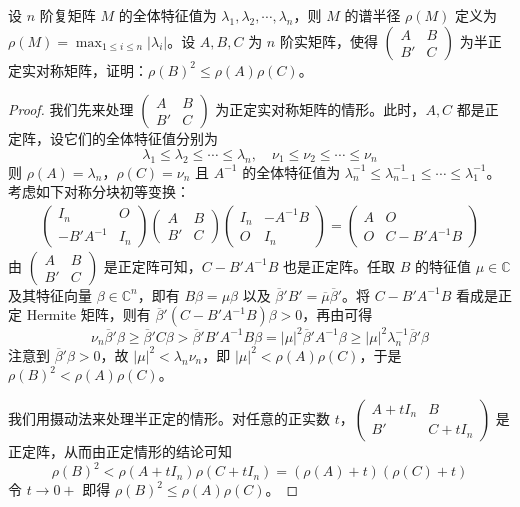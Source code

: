 \documentclass[../../main.tex]{subfiles}
\begin{document}
\begin{proposition}\label{proposition:例9.57}
设 \(n\) 阶复矩阵 \(M\) 的全体特征值为 \(\lambda_1,\lambda_2,\cdots,\lambda_n\)，则 \(M\) 的谱半径 \(\rho(M)\) 定义为 \(\rho(M)=\max_{1\leq i \leq n}|\lambda_i|\)。设 \(A,B,C\) 为 \(n\) 阶实矩阵，使得 \(\begin{pmatrix}
A & B \\
B' & C
\end{pmatrix}\) 为半正定实对称矩阵，证明：\(\rho(B)^2 \leq \rho(A)\rho(C)\)。
\end{proposition}
\begin{proof}
我们先来处理 \(\begin{pmatrix}
A & B \\
B' & C
\end{pmatrix}\) 为正定实对称矩阵的情形。此时，\(A,C\) 都是正定阵，设它们的全体特征值分别为
\[
\lambda_1 \leq \lambda_2 \leq \cdots \leq \lambda_n,\quad \nu_1 \leq \nu_2 \leq \cdots \leq \nu_n
\]
则 \(\rho(A) = \lambda_n\)，\(\rho(C) = \nu_n\) 且 \(A^{-1}\) 的全体特征值为 \(\lambda_n^{-1} \leq \lambda_{n - 1}^{-1} \leq \cdots \leq \lambda_1^{-1}\)。考虑如下对称分块初等变换：
\begin{align*}
\begin{pmatrix}
I_n & O \\
-B'A^{-1} & I_n
\end{pmatrix}
\begin{pmatrix}
A & B \\
B' & C
\end{pmatrix}
\begin{pmatrix}
I_n & -A^{-1}B \\
O & I_n
\end{pmatrix}
=
\begin{pmatrix}
A & O \\
O & C - B'A^{-1}B
\end{pmatrix}
\end{align*}
由 \(\begin{pmatrix}
A & B \\
B' & C
\end{pmatrix}\) 是正定阵可知，\(C - B'A^{-1}B\) 也是正定阵。任取 \(B\) 的特征值 \(\mu \in \mathbb{C}\) 及其特征向量 \(\beta \in \mathbb{C}^n\)，即有 \(B\beta = \mu\beta\) 以及 \(\overline{\beta}'B' = \overline{\mu}\overline{\beta}'\)。将 \(C - B'A^{-1}B\) 看成是正定 Hermite 矩阵，则有 \(\overline{\beta}'(C - B'A^{-1}B)\beta > 0\)，再由可得
\[
\nu_n\overline{\beta}'\beta \geq \overline{\beta}'C\beta > \overline{\beta}'B'A^{-1}B\beta = |\mu|^2\overline{\beta}'A^{-1}\beta \geq |\mu|^2\lambda_n^{-1}\overline{\beta}'\beta
\]
注意到 \(\overline{\beta}'\beta > 0\)，故 \(|\mu|^2 < \lambda_n\nu_n\)，即 \(|\mu|^2 < \rho(A)\rho(C)\)，于是 \(\rho(B)^2 < \rho(A)\rho(C)\)。

我们用摄动法来处理半正定的情形。对任意的正实数 \(t\)，\(\begin{pmatrix}
A + tI_n & B \\
B' & C + tI_n
\end{pmatrix}\) 是正定阵，从而由正定情形的结论可知
\[
\rho(B)^2 < \rho(A + tI_n)\rho(C + tI_n) = (\rho(A) + t)(\rho(C) + t)
\]
令 \(t \to 0+\) 即得 \(\rho(B)^2 \leq \rho(A)\rho(C)\)。 
\end{proof}
\end{document}
